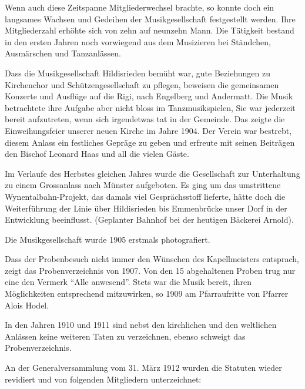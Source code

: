 \begin{multicols}{2}


    Wenn auch diese Zeitspanne Mitgliederwechsel brachte, so konnte doch ein
    langsames Wachsen und Gedeihen der Musikgesellschaft festgestellt werden.
    Ihre Mitgliederzahl erhöhte sich von zehn auf neunzehn Mann. Die Tätigkeit
    bestand in den ersten Jahren noch vorwiegend aus dem Musizieren bei
    Ständchen, Ausmärschen und Tanzanlässen.

    Dass die Musikgesellschaft Hildisrieden bemüht war, gute Beziehungen zu
    Kirchenchor und Schützengesellschaft zu pflegen, beweisen die gemeinsamen
    Konzerte und Ausflüge auf die Rigi, nach Engelberg und Andermatt. Die Musik
    betrachtete ihre Aufgabe aber nicht bloss im Tanzmusikspielen, Sie war
    jederzeit bereit aufzutreten, wenn sich irgendetwas tat in der Gemeinde. Das
    zeigte die Einweihungsfeier unserer neuen Kirche im Jahre 1904. Der Verein
    war bestrebt, diesem Anlass ein festliches Gepräge zu geben und erfreute mit
    seinen Beiträgen den Bischof Leonard Haas und all die vielen Gäste.

    Im Verlaufe des Herbstes gleichen Jahres wurde die Gesellschaft zur
    Unterhaltung zu einem Grossanlass nach Münster aufgeboten. Es ging um das
    umstrittene Wynentalbahn-Projekt, das damals viel Gesprächsstoff lieferte,
    hätte doch die Weiterführung der Linie über Hildisrieden bis Emmenbrücke
    unser Dorf in der Entwicklung beeinflusst. (Geplanter Bahnhof bei der
    heutigen Bäckerei Arnold).

    Die Musikgesellschaft wurde 1905 erstmals photografiert.

    Dass der Probenbesuch nicht immer den Wünschen des Kapellmeisters entsprach,
    zeigt das Probenverzeichnis von 1907. Von den 15 abgehaltenen Proben trug
    nur eine den Vermerk "`Alle anwesend"'. Stets war die Musik bereit, ihren
    Möglichkeiten entsprechend mitzuwirken, so 1909 am Pfarraufritte von
    Pfarrer Alois Hodel.

    In den Jahren 1910 und 1911 sind nebst den kirchlichen und den weltlichen
    Anlässen keine weiteren Taten zu verzeichnen, ebenso schweigt das
    Probenverzeichnis.

    An der Generalversammlung vom 31. März 1912 wurden die Statuten wieder
    revidiert und von folgenden Mitgliedern unterzeichnet:


\end{multicols}
